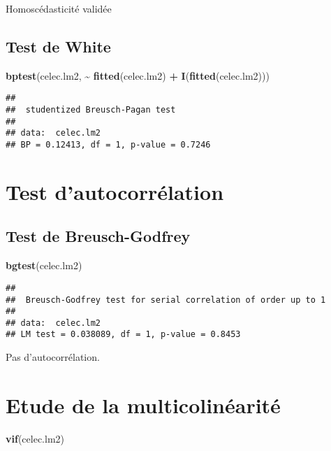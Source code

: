 \documentclass[
]{article}
\newenvironment{Shaded}{\begin{snugshade}}{\end{snugshade}}
\newcommand{\FunctionTok}[1]{\textcolor[rgb]{0.13,0.29,0.53}{\textbf{#1}}}
\newcommand{\NormalTok}[1]{#1}
\newcommand{\SpecialCharTok}[1]{\textcolor[rgb]{0.81,0.36,0.00}{\textbf{#1}}}
\begin{document}
Homoscédasticité validée

\subsection{Test de White}\label{test-de-white}

\begin{Shaded}
\begin{Highlighting}[]
\FunctionTok{bptest}\NormalTok{(celec.lm2, }\SpecialCharTok{\textasciitilde{}} \FunctionTok{fitted}\NormalTok{(celec.lm2) }\SpecialCharTok{+} \FunctionTok{I}\NormalTok{(}\FunctionTok{fitted}\NormalTok{(celec.lm2)))}
\end{Highlighting}
\end{Shaded}

\begin{verbatim}
## 
##  studentized Breusch-Pagan test
## 
## data:  celec.lm2
## BP = 0.12413, df = 1, p-value = 0.7246
\end{verbatim}

\section{Test d'autocorrélation}\label{test-dautocorruxe9lation}

\subsection{Test de Breusch-Godfrey}\label{test-de-breusch-godfrey}

\begin{Shaded}
\begin{Highlighting}[]
\FunctionTok{bgtest}\NormalTok{(celec.lm2)}
\end{Highlighting}
\end{Shaded}

\begin{verbatim}
## 
##  Breusch-Godfrey test for serial correlation of order up to 1
## 
## data:  celec.lm2
## LM test = 0.038089, df = 1, p-value = 0.8453
\end{verbatim}

Pas d'autocorrélation.

\section{Etude de la
multicolinéarité}\label{etude-de-la-multicolinuxe9arituxe9}

\begin{Shaded}
\begin{Highlighting}[]
\FunctionTok{vif}\NormalTok{(celec.lm2)}
\end{Highlighting}
\end{Shaded}
\end{document}
